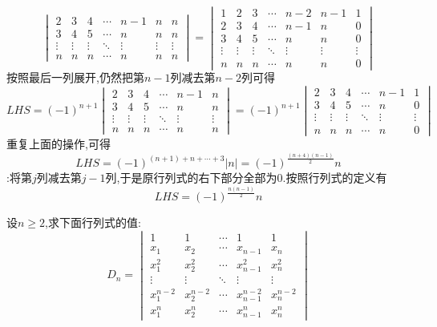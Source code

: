\documentclass{ctexart}
\begin{document}
\begin{solution}
\begin{enumerate}[label=\tbf{\arabic*}.,topsep=0pt,parsep=0pt,itemsep=0pt,partopsep=0pt]
\[\begin{vmatrix}
                2&3&4&\cdots&n-1&n&n\\
                3&4&5&\cdots&n&n&n\\
                \vdots&\vdots&\vdots&\ddots&\vdots&\vdots&\vdots\\
                n&n&n&\cdots&n&n&n
            \end{vmatrix}=\begin{vmatrix}
                1&2&3&\cdots&n-2&n-1&1\\
                2&3&4&\cdots&n-1&n&0\\
                3&4&5&\cdots&n&n&0\\
                \vdots&\vdots&\vdots&\ddots&\vdots&\vdots&\vdots\\
                n&n&n&\cdots&n&n&0
            \end{vmatrix}\]
            按照最后一列展开,仍然把第$n-1$列减去第$n-2$列可得
            \[LHS=(-1)^{n+1}\begin{vmatrix}
                2&3&4&\cdots&n-1&n\\
                3&4&5&\cdots&n&n\\
                \vdots&\vdots&\vdots&\ddots&\vdots&\vdots\\
                n&n&n&\cdots&n&n
            \end{vmatrix}=(-1)^{n+1}\begin{vmatrix}
                2&3&4&\cdots&n-1&1\\
                3&4&5&\cdots&n&0\\
                \vdots&\vdots&\vdots&\ddots&\vdots&\vdots\\
                n&n&n&\cdots&n&0
            \end{vmatrix}\]
            重复上面的操作,可得
            \[LHS=(-1)^{(n+1)+n+\cdots+3}\left|n\right|=(-1)^{\frac{(n+4)(n-1)}{2}}n\]
            :将第$j$列减去第$j-1$列,于是原行列式的右下部分全部为$0$.按照行列式的定义有
            \[LHS=(-1)^{\frac{n(n-1)}{2}}n\]
    \end{enumerate}
\end{solution}
\begin{problem}
    设$n\geqslant2$,求下面行列式的值:
    \[D_n=\begin{vmatrix}
        1&1&\cdots&1&1\\
        x_1&x_2&\cdots&x_{n-1}&x_n\\
        x_1^2&x_2^2&\cdots&x_{n-1}^2&x_n^2\\
        \vdots&\vdots&\ddots&\vdots&\vdots\\
        x_1^{n-2}&x_2^{n-2}&\cdots&x_{n-1}^{n-2}&x_n^{n-2}\\
        x_1^n&x_2^n&\cdots&x_{n-1}^n&x_n^n
    \end{vmatrix}\]
\end{problem}
\end{document}
